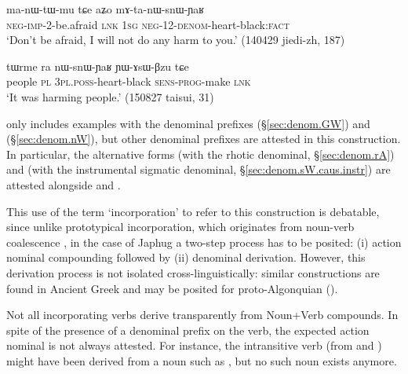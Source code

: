 \begin{exe}
\ex \label{ex:mAtnWsnWYAR}
\gll ma-nɯ-tɯ-mu tɕe aʑo  mɤ-ta-nɯ-snɯ-ɲaʁ \\
\textsc{neg}-\textsc{imp}-2-be.afraid \textsc{lnk} \textsc{1sg} \textsc{neg}-1\fl{}2-\textsc{denom}-heart-black:\textsc{fact} \\
 \glt `Don't be afraid, I will not do any harm to you.' (140429 jiedi-zh, 187)
\end{exe}

\begin{exe}
\ex \label{ex:nWsnWYaR}
\gll   tɯrme ra nɯ-snɯ-ɲaʁ ɲɯ-ɤsɯ-βzu tɕe \\
people \textsc{pl} \textsc{3pl}.\textsc{poss}-heart-black \textsc{sens}-\textsc{prog}-make \textsc{lnk} \\
 \glt `It was harming people.' (150827 taisui, 31)
 \end{exe}  
  
 only includes examples with the denominal prefixes  (§\ref{sec:denom.GW}) and  (§\ref{sec:denom.nW}), but other denominal prefixes are attested in this construction. In particular, the alternative forms  (with the rhotic denominal, §\ref{sec:denom.rA}) and   (with the instrumental sigmatic denominal, §\ref{sec:denom.sW.caus.instr}) are attested alongside   and .
 
This use of the term `incorporation' to refer to this construction is debatable, since unlike prototypical incorporation, which originates from noun-verb coalescence \citep{mithun84incorp}, in the case of Japhug a two-step process has to be posited: (i) action nominal compounding followed by (ii) denominal derivation. However, this derivation process is not isolated cross-linguistically: similar constructions are found in Ancient Greek \citep{benveniste66incorp} and may be posited for proto-Algonquian (\citealt{garrett04stem.structure,jacques12incorp}). 
 
Not all incorporating verbs derive transparently from Noun+Verb compounds. In spite of the presence of a denominal prefix on the verb, the expected action nominal is not always attested. For instance, the intransitive verb  (from   and  ) might have been derived from a noun such as , but no such noun exists anymore.


